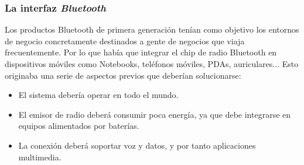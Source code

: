   \subsubsection{La interfaz \emph{Bluetooth}}
Los productos Bluetooth de primera generación tenían como objetivo los 
entornos de negocio concretamente destinados a gente de negocios que viaja 
frecuentemente. Por lo que había que integrar el chip de radio Bluetooth en 
dispositivos móviles como Notebooks, teléfonos móviles, PDAs, auriculares... 
Esto originaba una serie de aspectos previos que deberían solucionarse:
\begin{itemize}
\item El sistema debería operar en todo el mundo.
\item El emisor de radio deberá consumir poca energía, ya que debe 
integrarse en equipos alimentados por baterías.
\item La conexión deberá soportar voz y datos, y por tanto aplicaciones 
multimedia.
\end{itemize}

